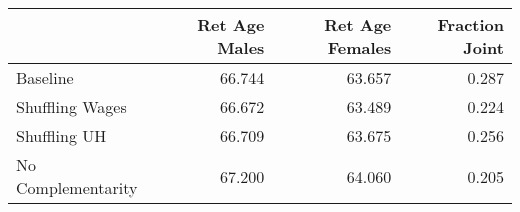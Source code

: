 \begin{tabular}{lrrr}
\toprule
{} & Ret Age Males & Ret Age Females & Fraction Joint \\
\midrule
Baseline           &        66.744 &          63.657 &          0.287 \\
Shuffling Wages    &        66.672 &          63.489 &          0.224 \\
Shuffling UH       &        66.709 &          63.675 &          0.256 \\
No Complementarity &        67.200 &          64.060 &          0.205 \\
\bottomrule
\end{tabular}
